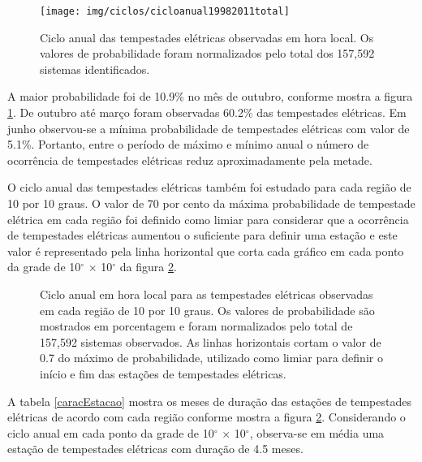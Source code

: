 \begin{figure}[!h]
\centering
{\texttt{[image: img/ciclos/cicloanual19982011total]}}
\caption{Ciclo anual das tempestades elétricas observadas em hora local. Os valores de probabilidade foram normalizados pelo total dos 157,592 sistemas identificados.}
\label{cicloanualtotal}
\end{figure} 

A maior probabilidade foi de 10.9\%  no mês de outubro, conforme mostra a figura \ref{cicloanualtotal}. De outubro até março foram observadas 60.2\% das tempestades elétricas. Em junho observou-se a mínima probabilidade de tempestades elétricas com valor de 5.1\%. Portanto, entre o período de máximo e mínimo anual o número de ocorrência de tempestades elétricas reduz aproximadamente pela metade.



O ciclo anual das tempestades elétricas também foi estudado para cada região de 10 por 10 graus. O valor de 70 por cento da máxima probabilidade de tempestade elétrica em cada região foi definido como limiar para considerar que a ocorrência de tempestades elétricas aumentou o suficiente para definir uma estação e este valor é representado pela linha horizontal que corta cada gráfico em cada ponto da grade de 10$^{\circ}$ $\times$ 10$^{\circ}$ da figura \ref{anual}. 

\begin{figure}[!h]
\caption{Ciclo anual em hora local para as tempestades elétricas observadas em cada região de 10 por 10 graus. Os valores de probabilidade são mostrados em porcentagem e foram normalizados pelo total de 157,592 sistemas observados. As linhas horizontais cortam o valor de 0.7 do máximo de probabilidade, utilizado como limiar para definir o início e fim das estações de tempestades elétricas.}
\label{anual}
\end{figure}

A tabela \ref{caracEstacao} mostra os meses de duração das estações de tempestades elétricas de acordo com cada região conforme mostra a figura \ref{anual}. Considerando o ciclo anual em cada ponto da grade de 10$^{\circ}$ $\times$ 10$^{\circ}$, observa-se em média uma estação de tempestades elétricas com duração de 4.5 meses. 





